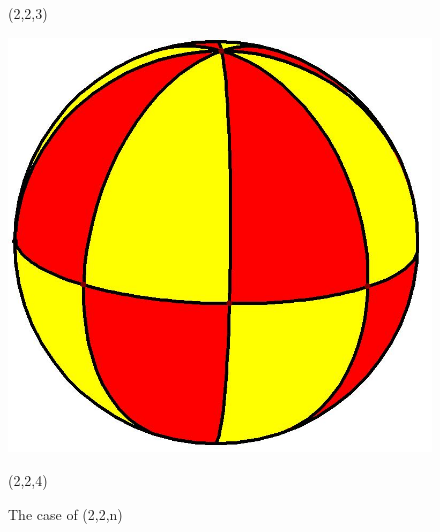 \documentclass{article}
\begin{document}
\begin{figure}[ht]
\begin{minipage}{0.2\linewidth}
        \caption{(2,2,3)}
        \label{fig:subim7}
    \end{minipage}
    \begin{minipage}{0.2\linewidth}
        \includegraphics[width=0.9\linewidth]{（2，2，4）.jpg}
        \caption{(2,2,4)}
        \label{fig:subim8}
    \end{minipage}
    \caption{The case of (2,2,n)}
    \label{fig:image3}
\end{figure}
\end{document}
